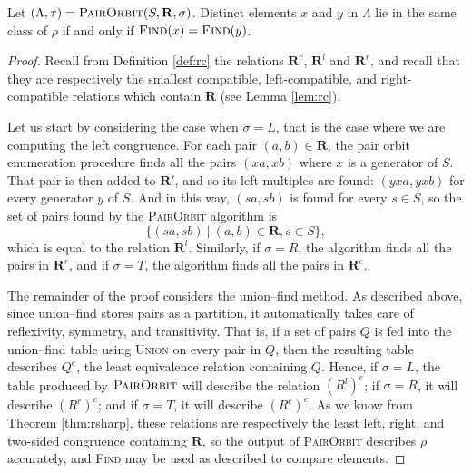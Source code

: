 \begin{theorem}
  \label{thm:p}
  Let $(\Lambda, \tau) = \textsc{PairOrbit}(S, \mathbf{R}, \sigma)$.  Distinct elements
  $x$ and $y$ in $\Lambda$ lie in the same class of $\rho$ if and only if
  $\textsc{Find}(x) = \textsc{Find}(y)$.
  \begin{proof}
    Recall from Definition \ref{def:rc} the relations $\mathbf{R}^c$,
    $\mathbf{R}^l$ and $\mathbf{R}^r$, and recall that they are respectively the
    smallest compatible, left-compatible, and right-compatible relations which
    contain $\mathbf{R}$ (see Lemma \ref{lem:rc}).

    Let us start by considering the case when $\sigma = L$, that is the case
    where we are computing the left congruence.  For each pair
    $(a,b) \in \mathbf{R}$, the pair orbit enumeration procedure finds all the
    pairs $(xa, xb)$ where $x$ is a generator of $S$.  That pair is then added
    to $\mathbf{R}'$, and so its left multiples are found: $(yxa, yxb)$ for
    every generator $y$ of $S$.  And in this way, $(sa, sb)$ is found for every
    $s \in S$, so the set of pairs found by the \textsc{PairOrbit} algorithm is
    $$\{(sa, sb) ~|~ (a,b) \in \mathbf{R}, s \in S\},$$
    which is equal to the relation $\mathbf{R}^l$.
    Similarly, if $\sigma = R$, the algorithm finds all the pairs in
    $\mathbf{R}^r$, and if $\sigma = T$, the algorithm finds all the pairs in
    $\mathbf{R}^c$.

    The remainder of the proof considers the union--find method.  As described
    above, since union--find stores pairs as a partition, it automatically takes
    care of reflexivity, symmetry, and transitivity.  That is, if a set of pairs
    $Q$ is fed into the union--find table using \textsc{Union} on every pair in
    $Q$, then the resulting table describes $Q^e$, the least equivalence
    relation containing $Q$.  Hence, if $\sigma = L$, the table produced by
    $\textsc{PairOrbit}$ will describe the relation $(R^l)^e$; if $\sigma = R$, it will
    describe $(R^r)^e$; and if $\sigma = T$, it will describe $(R^c)^e$.  As we
    know from Theorem \ref{thm:rsharp}, these relations are respectively the least
    left, right, and two-sided congruence containing $\mathbf{R}$, so the output
    of \textsc{PairOrbit} describes $\rho$ accurately, and \textsc{Find} may be used as
    described to compare elements.
  \end{proof}
\end{theorem}

